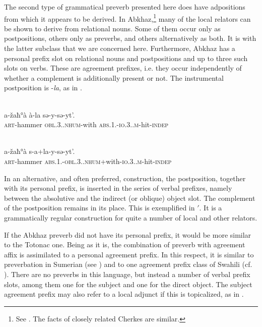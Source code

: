The second type of grammatical preverb presented here does have adpositions from which it appears to be derived. In Abkhaz,\footnote{See \citet[113--149]{Hewitt1979}. The facts of closely related Cherkes are similar.} many of the local relators can be shown to derive from relational nouns. Some of them occur only as postpositions, others only as preverbs, and others alternatively as both. It is with the latter subclass that we are concerned here. Furthermore, Abkhaz has a personal prefix slot on relational nouns and postpositions and up to three such slots on verbs. These are agreement prefixes, i.e. they occur independently of whether a complement \np is additionally present or not. The instrumental postposition is -\textit{la}, as in .

\ea\label{ex:E83}
\\
 \gll a-žaħ°à  à-la  sə-y-sə-yt'.\\
 \textsc{art}-hammer  \textsc{obl}.3.\glsg.\textsc{nhum}-with  \textsc{abs}.1.\glsg-\textsc{io}.3.\glsg.\textsc{m}-hit-\textsc{indep}\\
\\
\z
\noindent \begin{exe} 
\gll a-žaħ°à  s-a+la-y-sə-yt'.\\
 \textsc{art}-hammer \textsc{abs}.1.\glsg-\textsc{obl}.3.\glsg.\textsc{nhum}+with-\textsc{io}.3.\glsg.\textsc{m}-hit-\textsc{indep}\\
\end{exe}

\noindent In an alternative, and often preferred, construction, the postposition, together with its personal prefix, is inserted in the series of verbal prefixes, namely between the absolutive and the indirect (or oblique) object slot. The \np complement of the postposition remains in its place. This is exemplified in $'$. It is a grammatically regular construction for quite a number of local and other relators.

If the Abkhaz preverb did not have its personal prefix, it would be more similar to the Totonac one. Being as it is, the combination of preverb with agreement affix is assimilated to a personal agreement prefix. In this respect, it is similar to preverbation in Sumerian (see \citealt[46--49, 59f]{Falkenstein1959}) and to one agreement prefix class of Swahili (cf. \citealt[48]{Kahr1975}). There are no preverbs in this language, but instead a number of verbal prefix slots, among them one for the subject and one for the direct object. The subject agreement prefix may also refer to a local adjunct if this is topicalized, as in .

